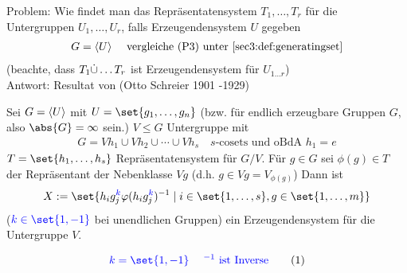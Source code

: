 Problem: Wie findet man das Repräsentatensystem $T_1, \dots, T_r$ für die Untergruppen $U_1, \dots, U_r$, falls Erzeugendensystem $U$ gegeben
\begin{align*}
	G = \gen{U} \quad \text{ vergleiche (P3) unter \cref{sec3:def:generatingset}}
\end{align*}
(beachte, dass $T_1\dot\cup \dots T_r$ ist Erzeugendensystem für $U_{1\dots r}$)\\
Antwort: Resultat von  (Otto Schreier 1901 -1929)
\begin{proposition}
	\label{sec3:prop:schreier} Sei $G = \langle U \rangle$ mit $U = \set{g_1, \dots,g_n}$ (bzw. für endlich erzeugbare Gruppen $G$, also $\abs{G} = \infty$ sein.) $V \le G$ Untergruppe mit
	\begin{align*}
		G = Vh_1 \cup Vh_2 \cup \cdots \cup Vh_s \quad s\text{-cosets und oBdA }h_1 = e
	\end{align*}
	$T = \set{h_1, \dots, h_s}$ Repräsentatensystem für $G/V$. Für $g \in G$ sei $\phi(g) \in T$ der Repräsentant der Nebenklasse $Vg$ (d.h. $g \in Vg = V_{\phi(g)}$) Dann ist
	\begin{align*}
		X := \set{h_i g_j^{\scyllanote{k}}\phi(h_i g_j^{\scyllanote{k}})^{-1} \mid i \in \set{1,\dots,s}, g \in \set{1, \dots,m}}
	\end{align*}
	($\scyllanote{k \in \set{1,-1}}$ bei unendlichen Gruppen) ein Erzeugendensystem für die Untergruppe $V$.
\end{proposition}
\begin{*remark}
	\begin{align*}
		\scyllanote{k = \set{1,-1} \quad \text{$\;^{-1}$ ist
		Inverse}}\label{sec3:remark:infty_groups}\tag{1}
	\end{align*}
\end{*remark}
